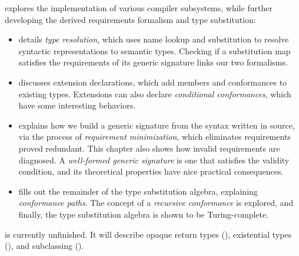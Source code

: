 \documentclass[../generics]{subfiles}
\begin{document}
 explores the implementation of various compiler subsystems, while further developing the derived requirements formalism and type substitution:
\begin{itemize}
\item {} details \emph{type resolution}, which uses name lookup and substitution to resolve syntactic representations to semantic types. Checking if a substitution map satisfies the requirements of its generic signature links our two formalisms.

\item {} discusses extension declarations, which add members and conformances to existing types. Extensions can also declare \emph{conditional conformances}, which have some interesting behaviors.

\item {} explains how we build a generic signature from the syntax written in source, via the process of \emph{requirement minimization}, which eliminates requirements proved redundant. This chapter also shows how invalid requirements are diagnosed. A \emph{well-formed generic signature} is one that satisfies the validity condition, and its theoretical properties have nice practical consequences.

\item {} fills out the remainder of the type substitution algebra, explaining  \emph{conformance paths}. The concept of a \emph{recursive conformance} is explored, and finally, the type substitution algebra is shown to be Turing-complete.
\end{itemize}

 is currently unfinished. It will describe opaque return types (), existential types (), and subclassing ().
\end{document}
